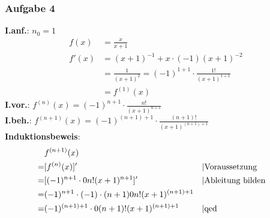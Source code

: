 \subsubsection{Aufgabe 4}
\textbf{I.anf.}: $ n_0 = 1 $\begin{align*}
f(x) &= \frac{x}{x+1}\\
f'(x) &= (x+1)^{-1} + x\cdot(-1)(x+1)^{-2} \\
			&= \frac{1}{(x+1)^2} = (-1)^{1+1}\cdot \frac{1!}{(x+1)^{1+1}}\\
			&= f^{(1)}(x)\end{align*}
\textbf{I.vor.}: $ f^{(n)}(x) = (-1)^{n+1} \cdot \frac{n!}{(x+1)^{n+1}} $\\
\textbf{I.beh.}: $ f^{(n+1)}(x) = (-1)^{(n+1)+1} \cdot \frac{(n+1)!}{(x+1)^{(n+1)+1}} $\\
\textbf{Induktionsbeweis}:\begin{align*}
&f^{(n+1)}(x) \\= &[f^{(n)}(x)]'&& \text{\textbar Voraussetzung}\\
							= &[(-1)^{n+1} \cdot \frac{n!}{(x+1)^{n+1}}]' && \text{\textbar Ableitung bilden}\\
							= &(-1)^{n+1} \cdot (-1) \cdot (n+1) \frac{n!}{(x+1)^{(n+1)+1}} \\
							= &(-1)^{(n+1)+1} \cdot \frac{(n+1)!}{(x+1)^{(n+1)+1}} && \text{\textbar qed}\end{align*}
